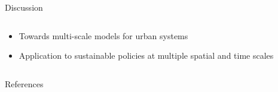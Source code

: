 \documentclass{beamer}
\begin{document}
\begin{frame}{}
\begin{columns}[t]
\begin{column}{.49\textwidth}
\begin{block}{Discussion}
\begin{columns}[t]
\begin{column}{.95\textwidth}
		\begin{itemize}
			\item \justify Towards multi-scale models for urban systems
		
		\end{itemize}
		
		\begin{itemize}
			\item \justify Application to sustainable policies at multiple spatial and time scales \cite{rozenblat2018conclusion}
		\end{itemize}
          
          \end{column}
          \end{columns}
        \end{block}
        
        
        
      \end{column}
    \end{columns}
    
    
    \begin{block}{References}
        {\tiny
        \vspace{-1cm}
        \begin{multicols}{4}
          
          
        \end{multicols}
          }
        \end{block}
    
  \end{frame}
\end{document}
